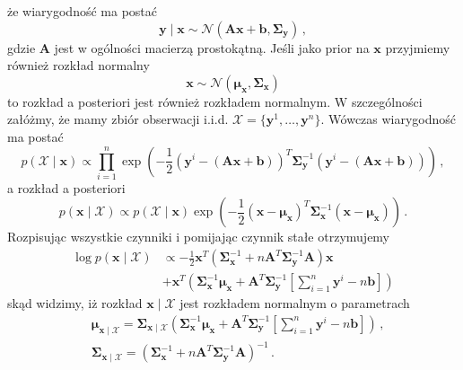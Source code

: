 \documentclass{myclass}
\numberwithin{equation}{section}
\begin{document}
że wiarygodność ma postać
\begin{equation}
    \mathbf{y} \mid \mathbf{x} \sim \mathcal{N}(\mathbf{A}\mathbf{x} + \mathbf{b}, \boldsymbol{\Sigma}_\mathbf{y})\,,
\end{equation}
gdzie \(\mathbf{A}\) jest w ogólności macierzą prostokątną. Jeśli jako prior na \(\mathbf{x}\)
przyjmiemy również rozkład normalny
\begin{equation}
    \mathbf{x} \sim \mathcal{N}(\boldsymbol{\mu}_\mathbf{x}, \boldsymbol{\Sigma}_\mathbf{x})
\end{equation}
to rozkład a posteriori jest również rozkładem normalnym. W szczególności załóżmy, że mamy zbiór
obserwacji i.i.d. \(\mathcal{X} = \{\mathbf{y}^1, \ldots, \mathbf{y}^n\}\). Wówczas wiarygodność ma
postać
\begin{equation}
    p(\mathcal{X} \mid \mathbf{x}) \propto \prod_{i=1}^n \exp\left(-\frac{1}{2}(\mathbf{y}^i - (\mathbf{Ax}+\mathbf{b}))^T\boldsymbol{\Sigma}_\mathbf{y}^{-1}(\mathbf{y}^i - (\mathbf{Ax}+\mathbf{b}))\right)\,,
\end{equation}
a rozkład a posteriori
\begin{equation}
    p(\mathbf{x} \mid \mathcal{X}) \propto p(\mathcal{X} \mid \mathbf{x}) \exp\left(-\frac{1}{2}(\mathbf{x} - \boldsymbol{\mu}_\mathbf{x})^T\boldsymbol{\Sigma}_\mathbf{x}^{-1}(\mathbf{x} - \boldsymbol{\mu}_\mathbf{x})\right)\,.
\end{equation}
Rozpisując wszystkie czynniki i pomijając czynnik stałe otrzymujemy
\begin{equation}
    \begin{split}
        \log p(\mathbf{x} \mid \mathcal{X}) &\propto -\frac{1}{2}\mathbf{x}^T\left(\boldsymbol{\Sigma}_\mathbf{x}^{-1} + n\mathbf{A}^T\boldsymbol{\Sigma}_\mathbf{y}^{-1}\mathbf{A}\right)\mathbf{x}\\
        & + \mathbf{x}^T\left(\boldsymbol{\Sigma}_\mathbf{x}^{-1}\boldsymbol{\mu}_\mathbf{x} + \mathbf{A}^T\boldsymbol{\Sigma}_\mathbf{y}^{-1}\left[\sum_{i=1}^n\mathbf{y}^i - n\mathbf{b}\right]\right)
    \end{split}
\end{equation}
skąd widzimy, iż rozkład \(\mathbf{x} \mid \mathcal{X}\) jest rozkładem normalnym o parametrach
\begin{equation}\label{eq:linear_gauss}\boxed{
    \begin{split}
        &\boldsymbol{\mu}_{\mathbf{x} \mid \mathcal{X}} = \boldsymbol{\Sigma}_{\mathbf{x} \mid \mathcal{X}} \left(\boldsymbol{\Sigma}_\mathbf{x}^{-1}\boldsymbol{\mu}_\mathbf{x} + \mathbf{A}^T\boldsymbol{\Sigma}_\mathbf{y}^{-1}\left[\sum_{i=1}^n\mathbf{y}^i - n\mathbf{b}\right]\right) \,,\\
        &\boldsymbol{\Sigma}_{\mathbf{x} \mid \mathcal{X}} = \left(\boldsymbol{\Sigma}_\mathbf{x}^{-1} + n\mathbf{A}^T\boldsymbol{\Sigma}_\mathbf{y}^{-1}\mathbf{A}\right)^{-1}\,.
    \end{split}
}\end{equation}
\end{document}
